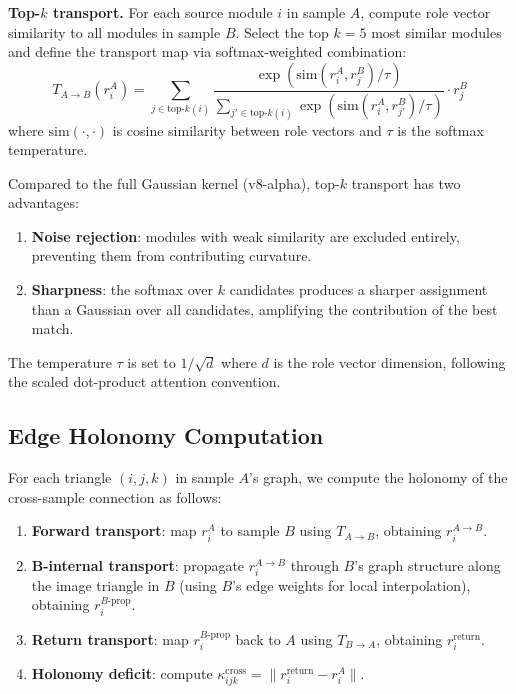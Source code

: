 \documentclass{../yalumba}
\begin{document}
\begin{definition}
\textbf{Top-$k$ transport.}  For each source module $i$ in sample $A$,
compute role vector similarity to all modules in sample $B$.  Select the
top $k = 5$ most similar modules and define the transport map via
softmax-weighted combination:
\begin{equation}
  T_{A \to B}(r_i^A) = \sum_{j \in \text{top-}k(i)}
    \frac{\exp(\text{sim}(r_i^A, r_j^B) / \tau)}
         {\sum_{j' \in \text{top-}k(i)} \exp(\text{sim}(r_i^A, r_{j'}^B) / \tau)}
    \cdot r_j^B
  \label{eq:topk-transport}
\end{equation}
where $\text{sim}(\cdot, \cdot)$ is cosine similarity between role vectors
and $\tau$ is the softmax temperature.
\end{definition}


Compared to the full Gaussian kernel (v8-alpha), top-$k$ transport has two
advantages:
\begin{enumerate}
  \item \textbf{Noise rejection}: modules with weak similarity are excluded
    entirely, preventing them from contributing curvature.
  \item \textbf{Sharpness}: the softmax over $k$ candidates produces a
    sharper assignment than a Gaussian over all candidates, amplifying the
    contribution of the best match.
\end{enumerate}

The temperature $\tau$ is set to $1/\sqrt{d}$ where $d$ is the role vector
dimension, following the scaled dot-product attention convention.

\subsection{Edge Holonomy Computation}
\label{sec:edge-holonomy}

For each triangle $(i, j, k)$ in sample $A$'s graph, we compute the
holonomy of the cross-sample connection as follows:

\begin{enumerate}
  \item \textbf{Forward transport}: map $r_i^A$ to sample $B$ using $T_{A
    \to B}$, obtaining $r_i^{A \to B}$.
  \item \textbf{B-internal transport}: propagate $r_i^{A \to B}$ through
    $B$'s graph structure along the image triangle in $B$ (using $B$'s edge
    weights for local interpolation), obtaining $r_i^{B\text{-prop}}$.
  \item \textbf{Return transport}: map $r_i^{B\text{-prop}}$ back to $A$
    using $T_{B \to A}$, obtaining $r_i^{\text{return}}$.
  \item \textbf{Holonomy deficit}: compute
    $\kappa_{ijk}^{\text{cross}} = \|r_i^{\text{return}} - r_i^A\|$.
\end{enumerate}
\end{document}
